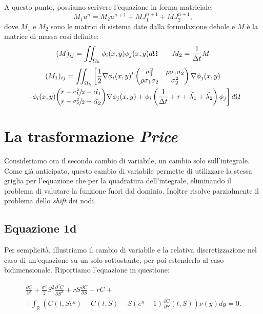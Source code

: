 \documentclass[a4paper,10pt]{report}
\newcommand{\der}[2]{\frac{\partial #1}{\partial #2}}
\newcommand{\dder}[2]{\frac{\partial^2 #1}{\partial #2^2}}
\theoremstyle{plain}
\theoremstyle{definition}
\theoremstyle{remark}
\begin{document}
A questo punto, possiamo scrivere l'equazione in forma matriciale: $$M_1u^n=M_2u^{n+1}+MJ_1^{n+1}+MJ_2^{n+1},$$ dove $M_1$ e $M_2$ sono le matrici di sistema date dalla formulazione debole e $M$ \`e la matrice di massa cosi definite:
\begin{equation*}
 (M)_{ij}=\iint_{\Omega_h}\phi_i(x,y)\phi_j(x,y)d\Omega \qquad M_2=\frac{1}{\Delta t}M\\
\end{equation*}
\begin{multline*}
  (M_1)_{ij}=\iint_{\Omega_h} \left[ \frac{1}{2}\nabla\phi_i(x,y)^t\left(\begin{matrix}\sigma_1^2 & \rho\sigma_1\sigma_2\\ \rho\sigma_1\sigma_2 & \sigma_2^2 \end{matrix}\right)\nabla\phi_j(x,y)\right.\\
  \left.-\phi_i(x,y)\binom{r-\sfrac{\sigma_1^2}{2}-\hat{\alpha_1}}{r-\sfrac{\sigma_2^2}{2}-\hat{\alpha_2}}\nabla\phi_j(x,y)
  + \phi_i\left(\frac{1}{\Delta t}+r+\hat{\lambda_1}+\hat{\lambda_2}\right)\phi_j \right] d\Omega
\end{multline*}



\section{La trasformazione \emph{Price}}
\label{sec:Price}
Consideriamo ora il secondo cambio di variabile, un cambio solo sull'integrale. Come già anticipato, questo cambio di variabile permette di utilizzare la stessa griglia per l'equazione che per la quadratura dell'integrale, eliminando il problema di valutare la funzione fuori dal dominio. Inoltre risolve parzialmente il problema dello \emph{shift} dei nodi.
\subsection{Equazione 1d}
Per semplicità, illustriamo il cambio di variabile e la relativa discretizzazione nel caso di un'equazione su un solo sottostante, per poi estenderlo al caso bidimensionale. Riportiamo l'equazione in questione:

\begin{multline*}
\label{eq:PIDE1d_will_price}
\der{C}{t}+\frac{\sigma^2}{2}S^2\dder{C}{S}+rS\der{C}{S}-rC+\\+ \int_\mathbb{R}\left(C(t,Se^y)-C(t,S)-S(e^y-1)\der{C}{S}(t,S)\right)\nu(y)dy=0.
\end{multline*}
\end{document}
